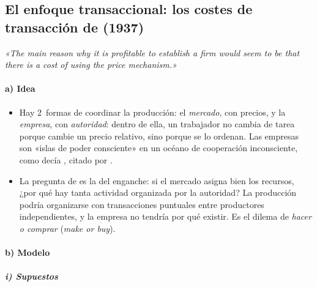 \documentclass[11pt]{article}
\begin{document}
\subsection{El enfoque transaccional: los costes de transacción de  (1937)}\label{sec:coase}

\begin{anotaciones}
\emph{«The main reason why it is profitable to establish a firm would seem to be that there is a cost of using the price mechanism.»} \textcite[p.~390]{Coase1937Nature}
\end{anotaciones}

\paragraph{a) Idea}

\begin{itemize}
\item Hay 2~formas de coordinar la producción: el \emph{mercado}, con precios, y la \emph{empresa}, con \emph{autoridad}: dentro de ella, un trabajador no cambia de tarea porque cambie un precio relativo, sino porque se lo ordenan. Las empresas son «islas de poder consciente» en un océano de cooperación inconsciente, como decía , citado por \textcite{Coase1937Nature}.
\item La pregunta de  es la del enganche: si el mercado asigna bien los recursos, ¿por qué hay tanta actividad organizada por la autoridad? La producción podría organizarse con transacciones puntuales entre productores independientes, y la empresa no tendría por qué existir. Es el dilema de \emph{hacer o comprar} (\emph{make or buy}).
\end{itemize}

\paragraph{b) Modelo}

\subparagraph{i) Supuestos}
\end{document}
